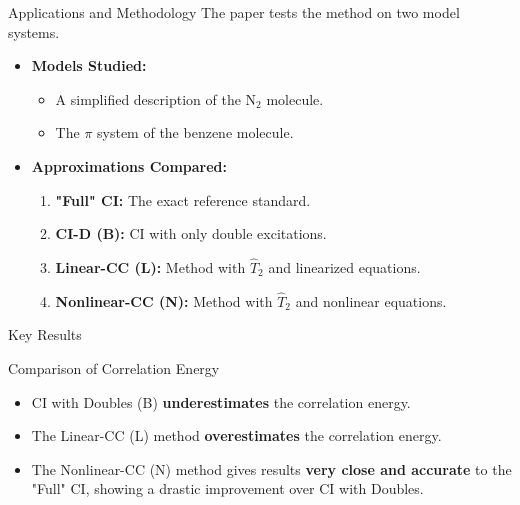 \begin{frame}{Applications and Methodology}
    The paper tests the method on two model systems.
    \pause

    \begin{itemize}
        \item \textbf{Models Studied:}
        \begin{itemize}
            \item A simplified description of the N$_2$ molecule.
            \item The $\pi$ system of the benzene molecule.
        \end{itemize}
        \pause
        \bigskip
        \item \textbf{Approximations Compared:}
        \begin{enumerate}
            \item<4-> \textbf{"Full" CI:} The exact reference standard.
            \item<5-> \textbf{CI-D (B):} CI with only double excitations.
            \item<6-> \textbf{Linear-CC (L):} Method with $\hat{T}_2$ and linearized equations.
            \item<7-> \textbf{Nonlinear-CC (N):} Method with $\hat{T}_2$ and nonlinear equations.
        \end{enumerate}
    \end{itemize}
\end{frame}

\begin{frame}{Key Results}
    \begin{block}{Comparison of Correlation Energy}
        \begin{itemize}
            \item CI with Doubles (B) \textbf{underestimates} the correlation energy.
            \pause
            \bigskip
            \item The Linear-CC (L) method \textbf{overestimates} the correlation energy.
            \pause
            \bigskip
            \item The Nonlinear-CC (N) method gives results \textbf{very close and accurate} to the "Full" CI, showing a drastic improvement over CI with Doubles.
        \end{itemize}
    \end{block}
\end{frame}

